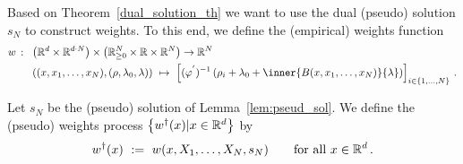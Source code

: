 Based on Theorem~\ref{dual_solution_th}
we want to use the dual (pseudo) solution $s_N$ to construct weights.
To this end, we define the (empirical) weights function
\begin{align*}
 w\ \colon\
 &
 \left( 
  \R^d\times \R^{d\cdot N}
 \right)
  \times
  \left( 
\R^N_{\ge 0}\times \R\times \R^N
  \right)
  \to
  \R^N
  \\
 &
  \left( 
  (x,x_1,\ldots,x_N),(\rho,\lambda_0,\lambda)
  \right)
  \ 
  \mapsto
  \ 
  \left[ 
  (\varphi^{'})^{-1}
  \left( 
    \rho_i
    +
    \lambda_0
    +
    \inner
    {B(x,x_1,\ldots,x_N)}
    {\lambda}
  \right)
\right]_{i\in \left\{ 1,\ldots,N \right\}}
\,.
\end{align*}
\begin{definition}
  Let $s_N$ be the (pseudo) solution of Lemma~\ref{lem:pseud_sol}.
  We define the (pseudo) weights process 
  $\left\{ w^\dagger(x) | x\in\mathbb{R}^d\right\}$
  by
  \begin{align*}
    w^\dagger(x) 
    \ 
    :=
    \ 
    w(x,X_1,\ldots,X_N,s_N)
    \qquad
    \text{for all}\ 
    x\in\R^d
    \,.
  \end{align*}
\end{definition}
